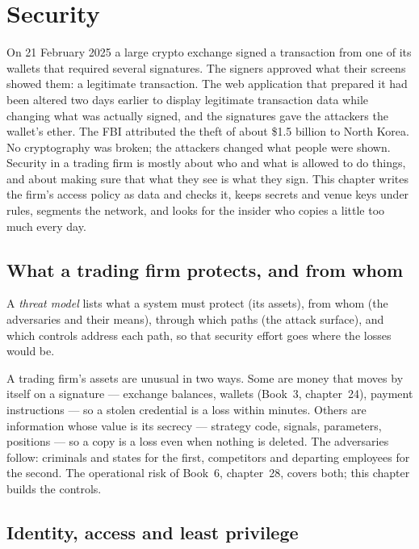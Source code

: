\chapter{Security}\label{ch:pl:security}

On 21 February 2025 a large crypto exchange signed a transaction from one of its wallets that required several signatures. The signers
approved what their screens showed them: a legitimate transaction. The web application that prepared it had been altered two days earlier to
display legitimate transaction data while changing what was actually signed, and the signatures gave the attackers the wallet's ether. The
FBI attributed the theft of about \$1.5 billion to North Korea. No cryptography was broken; the attackers changed what people were shown.
Security in a trading firm is mostly about who and what is allowed to do things, and about making sure that what they see is what they
sign. This chapter writes the firm's access policy as data and checks it, keeps secrets and venue keys under rules, segments the network,
and looks for the insider who copies a little too much every day.

\section{What a trading firm protects, and from whom}

\begin{definition}\label{def:pl:security:threat}
A \emph{threat model} lists what a system must protect (its assets), from whom (the adversaries and their means), through
which paths (the attack surface), and which controls address each path, so that security effort goes where the losses would be.
\end{definition}

A trading firm's assets are unusual in two ways. Some are money that moves by itself on a signature --- exchange balances, wallets (Book~3,
chapter~24), payment instructions --- so a stolen credential is a loss within minutes. Others are information whose value is its secrecy ---
strategy code, signals, parameters, positions --- so a copy is a loss even when nothing is deleted. The adversaries follow: criminals and
states for the first, competitors and departing employees for the second. The operational risk of Book~6, chapter~28, covers both; this
chapter builds the controls.

\section{Identity, access and least privilege}

